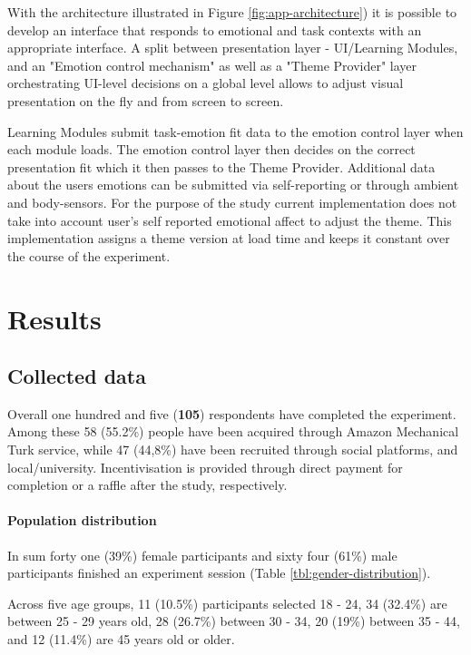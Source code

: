 With the architecture illustrated in Figure \ref{fig:app-architecture}) it is possible to develop an interface that responds to emotional and task contexts with an appropriate interface. A split between presentation layer - UI/Learning Modules, and an "Emotion control mechanism" as well as a "Theme Provider" layer orchestrating UI-level decisions on a global level allows to adjust visual presentation on the fly and from screen to screen.

Learning Modules submit task-emotion fit data to the emotion control layer when each module loads. The emotion control layer then decides on the correct presentation fit which it then passes to the Theme Provider. Additional data about the users emotions can be submitted via self-reporting or through ambient and body-sensors. For the purpose of the study current implementation does not take into account user's self reported emotional affect to adjust the theme. This implementation assigns a theme version at load time and keeps it constant over the course of the experiment.

\section{Results}

	\subsection{Collected data}
	
	Overall one hundred and five (\textbf{105}) respondents have completed the experiment. Among these 58 (55.2\%) people have been acquired through Amazon Mechanical Turk service, while 47 (44,8\%) have been recruited through social platforms, and local/university. Incentivisation is provided through direct payment for completion or a raffle after the study, respectively.
	
	\paragraph{Population distribution}
	
	In sum forty one (39\%) female participants and sixty four (61\%) male participants finished an experiment session (Table \ref{tbl:gender-distribution}).
	 
	Across five age groups, 11 (10.5\%) participants selected 18 - 24, 34 (32.4\%) are between 25 - 29  years old, 28 (26.7\%) between 30 - 34, 20 (19\%) between 35 - 44, and 12 (11.4\%) are 45 years old or older.
	
